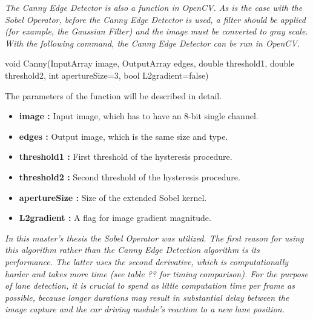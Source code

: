 \emph{\color{green}The Canny Edge Detector is also a function in OpenCV. As is the case with the Sobel Operator, before the Canny Edge Detector is used, a filter should be applied (for example, the Gaussian Filter) and the image must be converted to gray scale. With the following command, the Canny Edge Detector can be run in OpenCV.\cite{Canny_Edge_Detector3}}

 \begin{center}
 
void Canny(InputArray image, OutputArray edges, double threshold1, double threshold2, int apertureSize=3, bool L2gradient=false)

 \end{center}
 
 The parameters of the function will be described in detail.\cite{Canny_Edge_Detector3}
 
     \begin{itemize}

\item \textbf{image : }Input image, which has to have an 8-bit single channel.

\item \textbf{edges : }Output image, which is the same size and type.

\item \textbf{threshold1 : }First threshold of the hysteresis procedure.

\item \textbf{threshold2 : }Second threshold of the hysteresis procedure.

\item \textbf{apertureSize : }Size of the extended Sobel kernel.

\item \textbf{L2gradient : }A flag for image gradient magnitude.

\end{itemize}
 
%



\emph{\color{blue}In this master's thesis the Sobel Operator was utilized. The first reason for using this algorithm rather than the Canny Edge Detection algorithm is its performance. The latter uses the second derivative, which is computationally harder and takes more time (see table ?? for timing comparison). For the purpose of lane detection, it is crucial to spend as little computation time per frame as possible, because longer durations may result in substantial delay between the image capture and the car driving module's reaction to a new lane position. }

